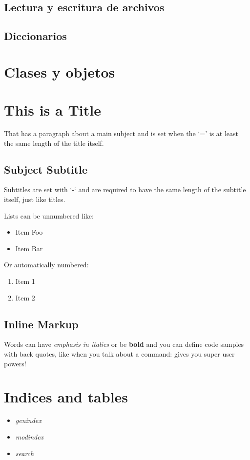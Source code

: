 \documentclass[a4paper,12pt,spanish]{sphinxmanual}
\begin{document}
\section{Lectura y escritura de archivos}
\label{Unidad04:lectura-y-escritura-de-archivos}

\section{Diccionarios}
\label{Unidad04:diccionarios}

\chapter{Clases y objetos}
\label{Unidad05::doc}\label{Unidad05:clases-y-objetos}

\chapter{This is a Title}
\label{example::doc}\label{example:this-is-a-title}
That has a paragraph about a main subject and is set when the `='
is at least the same length of the title itself.


\section{Subject Subtitle}
\label{example:subject-subtitle}
Subtitles are set with `-` and are required to have the same length
of the subtitle itself, just like titles.

Lists can be unnumbered like:
\begin{itemize}
\item {} 
Item Foo

\item {} 
Item Bar

\end{itemize}

Or automatically numbered:
\begin{enumerate}
\item {} 
Item 1

\item {} 
Item 2

\end{enumerate}


\section{Inline Markup}
\label{example:inline-markup}
Words can have \emph{emphasis in italics} or be \textbf{bold} and you can define
code samples with back quotes, like when you talk about a command: 
gives you super user powers!


\chapter{Indices and tables}
\label{index:indices-and-tables}\begin{itemize}
\item {} 
\emph{genindex}

\item {} 
\emph{modindex}

\item {} 
\emph{search}

\end{itemize}



\renewcommand{\indexname}{Índice}
\printindex
\end{document}
